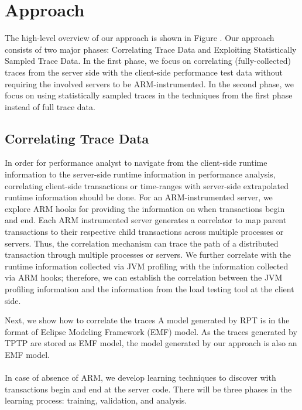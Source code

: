 \section{Approach}
\label{sec:approach}

The high-level overview of our approach is shown in Figure .
Our approach consists of two major phases: Correlating Trace Data and Exploiting Statistically Sampled Trace Data.
In the first phase, we focus on correlating (fully-collected) traces from the server side with the client-side performance test data without requiring the involved servers to be ARM-instrumented.
In the second phase, we focus on using statistically sampled traces in the techniques from the first phase instead of full trace data.

\subsection{Correlating Trace Data}
\label{sec:correlating}
In order for performance analyst to navigate from the client-side runtime information to the server-side runtime information in performance analysis, correlating client-side transactions or time-ranges with server-side extrapolated runtime information should be done.
For an ARM-instrumented server, we explore ARM hooks for providing the information on when transactions begin and end. Each ARM instrumented server generates a correlator to map parent transactions to their respective child transactions across multiple processes or servers. Thus, the correlation mechanism can trace the path of a distributed transaction through multiple processes or servers. We further correlate with the runtime information collected via JVM profiling with the information collected via ARM hooks; therefore, we can establish the correlation between the JVM profiling information and the information from the load testing tool at the client side.

Next, we show how to correlate the traces 
A model generated by RPT is in the format of Eclipse Modeling Framework (EMF\cite{emf}) model. As the traces generated by TPTP are stored as EMF model, the model generated by our approach is also an EMF model.
\\
\\
In case of absence of ARM, we develop learning techniques to discover with transactions begin and end at the server code. There will be three phases in the learning process: training, validation, and analysis.

